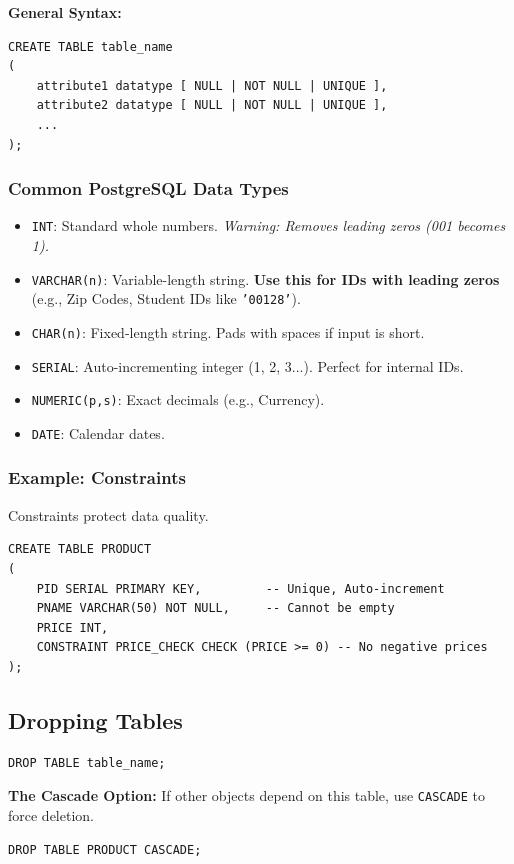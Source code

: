 \documentclass[12pt,a4paper]{article}
\begin{document}
\textbf{General Syntax:}
\begin{lstlisting}
CREATE TABLE table_name
(
    attribute1 datatype [ NULL | NOT NULL | UNIQUE ],
    attribute2 datatype [ NULL | NOT NULL | UNIQUE ],
    ...
);
\end{lstlisting}

\subsubsection{Common PostgreSQL Data Types}
\begin{itemize}
    \item \texttt{INT}: Standard whole numbers. \textit{Warning: Removes leading zeros (001 becomes 1).}
    \item \texttt{VARCHAR(n)}: Variable-length string. \textbf{Use this for IDs with leading zeros} (e.g., Zip Codes, Student IDs like \texttt{'00128'}).
    \item \texttt{CHAR(n)}: Fixed-length string. Pads with spaces if input is short.
    \item \texttt{SERIAL}: Auto-incrementing integer (1, 2, 3...). Perfect for internal IDs.
    \item \texttt{NUMERIC(p,s)}: Exact decimals (e.g., Currency).
    \item \texttt{DATE}: Calendar dates.
\end{itemize}

\subsubsection{Example: Constraints}
Constraints protect data quality.
\begin{lstlisting}
CREATE TABLE PRODUCT
(
    PID SERIAL PRIMARY KEY,         -- Unique, Auto-increment
    PNAME VARCHAR(50) NOT NULL,     -- Cannot be empty
    PRICE INT,
    CONSTRAINT PRICE_CHECK CHECK (PRICE >= 0) -- No negative prices
);
\end{lstlisting}

\subsection{Dropping Tables}
\begin{lstlisting}
DROP TABLE table_name;
\end{lstlisting}

\textbf{The Cascade Option:}
If other objects depend on this table, use \texttt{CASCADE} to force deletion.
\begin{lstlisting}
DROP TABLE PRODUCT CASCADE;
\end{lstlisting}
\end{document}
